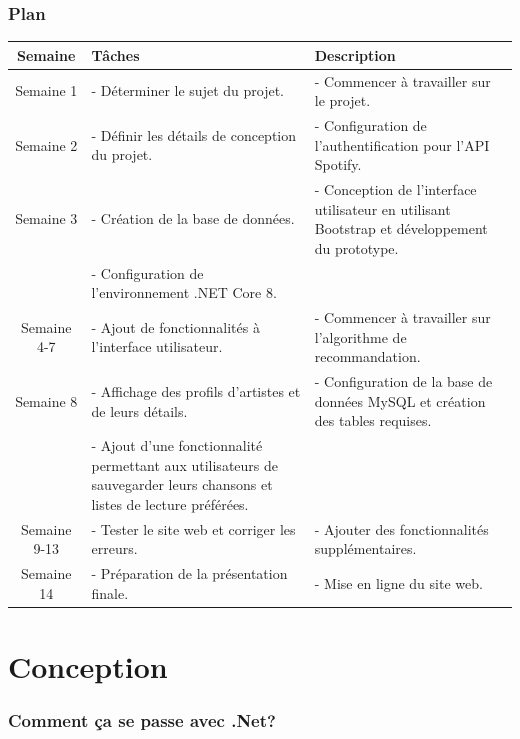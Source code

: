 \documentclass[20pt]{beamer}
\begin{document}
\begin{frame}
    \frametitle{Plan}
    \begin{center}
        \begin{tabular}{|c|p{15cm}|p{15cm}|}
            \hline
            \textbf{Semaine} & \textbf{Tâches} & \textbf{Description} \\
            \hline
            Semaine 1 & - Déterminer le sujet du projet. & - Commencer à travailler sur le projet. \\
            \hline
            Semaine 2 & - Définir les détails de conception du projet. & - Configuration de l'authentification pour l'API Spotify. \\
            \hline
            Semaine 3 & - Création de la base de données. & - Conception de l'interface utilisateur en utilisant Bootstrap et développement du prototype. \\ & - Configuration de l'environnement .NET Core 8. \\
            \hline
            Semaine 4-7 & - Ajout de fonctionnalités à l'interface utilisateur. & - Commencer à travailler sur l'algorithme de recommandation. \\
            \hline
            Semaine 8 & - Affichage des profils d'artistes et de leurs détails. & - Configuration de la base de données MySQL et création des tables requises. \\ & - Ajout d'une fonctionnalité permettant aux utilisateurs de sauvegarder leurs chansons et listes de lecture préférées. \\
            \hline
            Semaine 9-13 & - Tester le site web et corriger les erreurs. & - Ajouter des fonctionnalités supplémentaires. \\
            \hline
            Semaine 14 & - Préparation de la présentation finale. & - Mise en ligne du site web. \\
            \hline
        \end{tabular}
    \end{center}
\end{frame}

\section{Conception}

\begin{frame}
    \frametitle{Comment ça se passe avec .Net?}

\end{frame}
\end{document}
